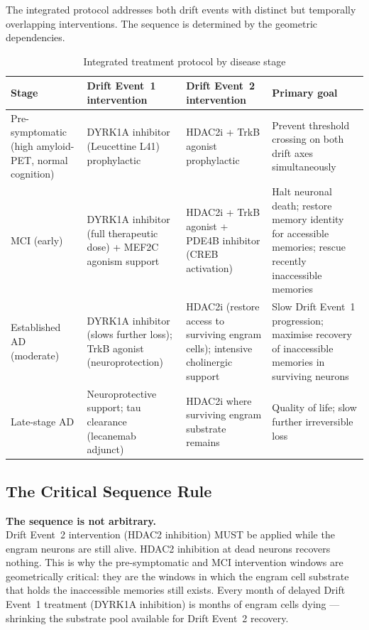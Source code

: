\documentclass[12pt,a4paper]{article}
\newenvironment{warnenv}{%
  \begin{tcolorbox}[colback=red!5,colframe=warnbox,boxrule=1pt,
    arc=3pt,left=8pt,right=8pt,top=6pt,bottom=6pt,breakable]}{%
  \end{tcolorbox}}
\begin{document}
The integrated protocol addresses both drift events
with distinct but temporally overlapping interventions.
The sequence is determined by the geometric dependencies.

\begin{table}[ht!]
\centering
\caption{Integrated treatment protocol by disease stage}
\label{tab:protocol}
\begin{tabular}{p{2.2cm}p{3.8cm}p{3.8cm}p{3.0cm}}
\toprule
\textbf{Stage} &
\textbf{Drift Event~1 intervention} &
\textbf{Drift Event~2 intervention} &
\textbf{Primary goal} \\
\midrule
Pre-symptomatic
(high amyloid-PET,
normal cognition) &
DYRK1A inhibitor (Leucettine L41)
prophylactic &
HDAC2i + TrkB agonist prophylactic &
Prevent threshold crossing on both
drift axes simultaneously \\[6pt]
MCI (early) &
DYRK1A inhibitor (full therapeutic
dose) + MEF2C agonism support &
HDAC2i + TrkB agonist +
PDE4B inhibitor (CREB activation) &
Halt neuronal death; restore memory
identity for accessible memories;
rescue recently inaccessible memories \\[6pt]
Established AD
(moderate) &
DYRK1A inhibitor (slows further loss);
TrkB agonist (neuroprotection) &
HDAC2i (restore access to surviving
engram cells); intensive cholinergic
support &
Slow Drift Event~1 progression;
maximise recovery of inaccessible
memories in surviving neurons \\[6pt]
Late-stage AD &
Neuroprotective support; tau
clearance (lecanemab adjunct) &
HDAC2i where surviving engram
substrate remains &
Quality of life; slow further
irreversible loss \\
\bottomrule
\end{tabular}
\end{table}

\subsection{The Critical Sequence Rule}

\begin{warnenv}
\textbf{The sequence is not arbitrary.}\\[4pt]
Drift Event~2 intervention (HDAC2 inhibition) MUST
be applied while the engram neurons are still alive.
HDAC2 inhibition at dead neurons recovers nothing.
This is why the pre-symptomatic and MCI intervention
windows are geometrically critical: they are the
windows in which the engram cell substrate that
holds the inaccessible memories still exists. Every
month of delayed Drift Event~1 treatment (DYRK1A
inhibition) is months of engram cells dying ---
shrinking the substrate pool available for Drift
Event~2 recovery.
\end{warnenv}
\end{document}
